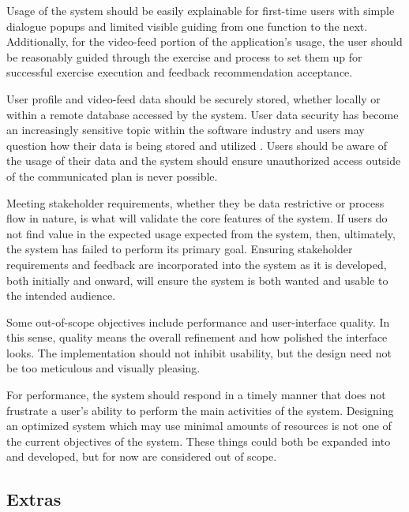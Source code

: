 \documentclass[12pt, titlepage]{article}
\begin{document}
Usage of the system should be easily explainable for first-time users with simple dialogue popups and limited visible guiding from one function to the next. Additionally, for the video-feed portion of the application’s usage, the user should be reasonably guided through the exercise and process to set them up for successful exercise execution and feedback recommendation acceptance.

User profile and video-feed data should be securely stored, whether locally or within a remote database accessed by the system. User data security has become an increasingly sensitive topic within the software industry and users may question how their data is being stored and utilized \citep{secureflag2026sensitive}. Users should be aware of the usage of their data and the system should ensure unauthorized access outside of the communicated plan is never possible.

Meeting stakeholder requirements, whether they be data restrictive or process flow in nature, is what will validate the core features of the system. If users do not find value in the expected usage expected from the system, then, ultimately, the system has failed to perform its primary goal. Ensuring stakeholder requirements and feedback are incorporated into the system as it is developed, both initially and onward, will ensure the system is both wanted and usable to the intended audience.

Some out-of-scope objectives include performance and user-interface quality. In this sense, quality means the overall refinement and how polished the interface looks. The implementation should not inhibit usability, but the design need not be too meticulous and visually pleasing.

For performance, the system should respond in a timely manner that does not frustrate a user’s ability to perform the main activities of the system. Designing an optimized system which may use minimal amounts of resources is not one of the current objectives of the system. These things could both be expanded into and developed, but for now are considered out of scope.

\subsection{Extras}
\end{document}
